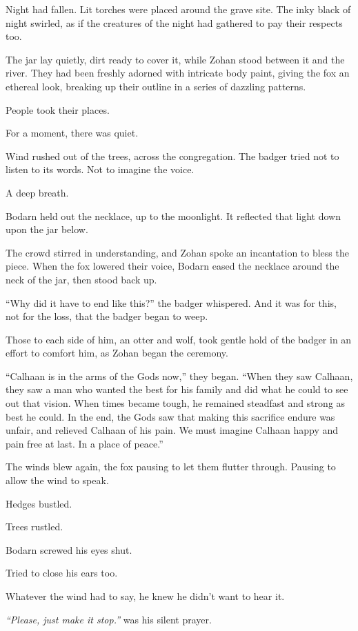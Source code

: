 Night had fallen. Lit torches were placed around the grave site. The inky black of night swirled, as if the creatures of the night had gathered to pay their respects too.

The jar lay quietly, dirt ready to cover it, while Zohan stood between it and the river. They had been freshly adorned with intricate body paint, giving the fox an ethereal look, breaking up their outline in a series of dazzling patterns.

People took their places.

For a moment, there was quiet.

Wind rushed out of the trees, across the congregation. The badger tried not to listen to its words. Not to imagine the voice.

A deep breath.

Bodarn held out the necklace, up to the moonlight. It reflected that light down upon the jar below.

The crowd stirred in understanding, and Zohan spoke an incantation to bless the piece. When the fox lowered their voice, Bodarn eased the necklace around the neck of the jar, then stood back up.

``Why did it have to end like this?'' the badger whispered. And it was for this, not for the loss, that the badger began to weep.

Those to each side of him, an otter and wolf, took gentle hold of the badger in an effort to comfort him, as Zohan began the ceremony.

``Calhaan is in the arms of the Gods now,'' they began. ``When they saw Calhaan, they saw a man who wanted the best for his family and did what he could to see out that vision. When times became tough, he remained steadfast and strong as best he could. In the end, the Gods saw that making this sacrifice endure was unfair, and relieved Calhaan of his pain. We must imagine Calhaan happy and pain free at last. In a place of peace.''

The winds blew again, the fox pausing to let them flutter through. Pausing to allow the wind to speak.

Hedges bustled.

Trees rustled.

Bodarn screwed his eyes shut.

Tried to close his ears too.

Whatever the wind had to say, he knew he didn't want to hear it.

\emph{``Please, just make it stop.''} was his silent prayer.

